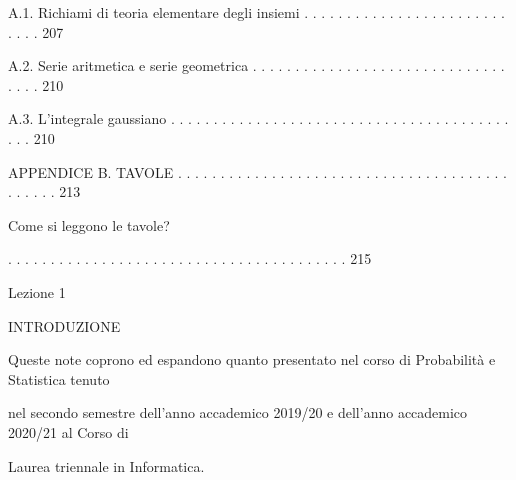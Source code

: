 \documentclass[a4paper,portrait,12pt]{article}
\begin{document}
\begin{flushleft}
A.1. Richiami di teoria elementare degli insiemi . . . . . . . . . . . . . . . . . . . . . . . . . . . . 207
\end{flushleft}


\begin{flushleft}
A.2. Serie aritmetica e serie geometrica . . . . . . . . . . . . . . . . . . . . . . . . . . . . . . . . . . 210
\end{flushleft}


\begin{flushleft}
A.3. L'integrale gaussiano . . . . . . . . . . . . . . . . . . . . . . . . . . . . . . . . . . . . . . . . . . . 210
\end{flushleft}


\begin{flushleft}
APPENDICE B. TAVOLE . . . . . . . . . . . . . . . . . . . . . . . . . . . . . . . . . . . . . . . . . . . . . 213
\end{flushleft}


\begin{flushleft}
Come si leggono le tavole?
\end{flushleft}





. . . . . . . . . . . . . . . . . . . . . . . . . . . . . . . . . . . . . . . . 215





\begin{flushleft}
\newpage
\newpage
Lezione 1
\end{flushleft}





\begin{flushleft}
INTRODUZIONE
\end{flushleft}


\begin{flushleft}
Queste note coprono ed espandono quanto presentato nel corso di Probabilit\`{a} e Statistica tenuto
\end{flushleft}


\begin{flushleft}
nel secondo semestre dell'anno accademico 2019/20 e dell'anno accademico 2020/21 al Corso di
\end{flushleft}


\begin{flushleft}
Laurea triennale in Informatica.
\end{flushleft}
\end{document}
